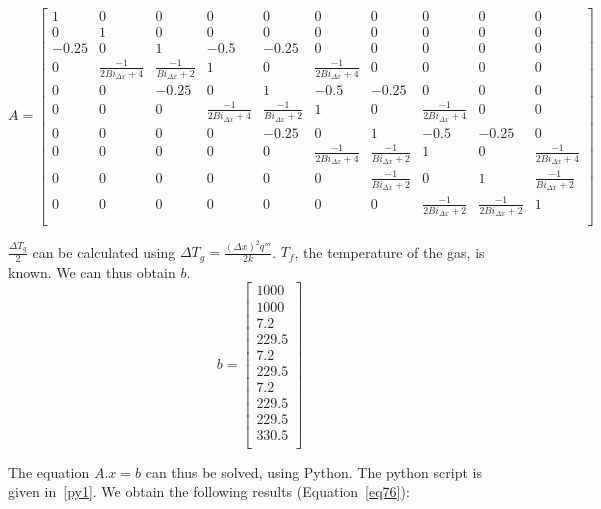 \setcounter{MaxMatrixCols}{30}
\tiny
\[
A =
  \begin{bmatrix}
1     & 0    & 0     & 0     & 0     & 0     & 0     & 0     & 0     & 0          \\
0     & 1    & 0     & 0     & 0     & 0     & 0     & 0     & 0     & 0          \\
-0.25 & 0    & 1     & -0.5  & -0.25 & 0     & 0     & 0     & 0     & 0          \\
0     & \frac{-1}{2Bi_{\Delta x}+4}     & \frac{-1}{Bi_{\Delta x}+2} & 1 & 0     & \frac{-1}{2Bi_{\Delta x}+4}  & 0 & 0     & 0     & 0          \\
0 & 0 & -0.25 & 0    & 1     & -0.5  & -0.25 & 0     & 0     & 0           \\
0 & 0 & 0     & \frac{-1}{2Bi_{\Delta x}+4}     & \frac{-1}{Bi_{\Delta x}+2} & 1 & 0     & \frac{-1}{2Bi_{\Delta x}+4}  & 0 & 0           \\
0 & 0 & 0 & 0 & -0.25 & 0    & 1     & -0.5  & -0.25 & 0            \\
0 & 0 & 0 & 0 & 0     & \frac{-1}{2Bi_{\Delta x}+4}     & \frac{-1}{Bi_{\Delta x}+2} & 1 & 0     & \frac{-1}{2Bi_{\Delta x}+4}           \\
0 & 0 & 0 & 0 & 0     & 0 & \frac{-1}{Bi_{\Delta x}+2} & 0 & 1 & \frac{-1}{Bi_{\Delta x}+2} \\
0 & 0 & 0 & 0 & 0     & 0 & 0 & \frac{-1}{2Bi_{\Delta x}+2} & \frac{-1}{2Bi_{\Delta x}+2} & 1 \\
  \end{bmatrix}
\]

\normalsize

$\frac{\Delta T_g}{2}$ can be calculated using $\Delta T_g = \frac{(\Delta x)^2 q'''}{2k}$. $T_f$, the temperature of the gas, is known. We can thus obtain $b$.
\tiny
\[
b =
  \begin{bmatrix}
1000 \\
1000 \\
7.2 \\
229.5\\
7.2\\
229.5\\
7.2 \\
229.5\\
229.5\\
330.5\\
   \end{bmatrix}
\]

\normalsize

The equation $A.x = b$ can thus be solved, using Python. The python script is given in~\ref{py1}. We obtain the following results (Equation~\ref{eq76}):

